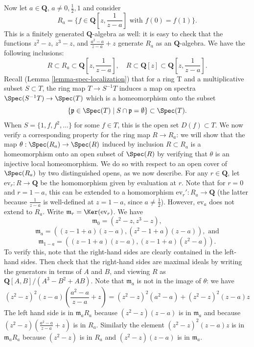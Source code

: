 \begin{example}
\medskip\noindent
Now let $a \in \mathbf{Q}$, $a \neq 0, \frac{1}{2}, 1$ and
consider
$$
R_a = \{ f \in \mathbf{Q}[z, \frac{1}{z-a}]\text{ with }f(0) = f(1)
\}.
$$
This is a finitely generated $\mathbf{Q}$-algebra as well: it is
easy to check that the functions $z^2-z$, $z^3-z$, and
$\frac{a^2-a}{z-a}+z$ generate $R_a$ as an $\mathbf{Q}$-algebra.  We
have the following inclusions:
$$
R\subset R_a\subset\mathbf{Q}[z, \frac{1}{z-a}], \quad
R\subset\mathbf{Q}[z]\subset\mathbf{Q}[z, \frac{1}{z-a}].
$$
Recall (Lemma \ref{lemma-spec-localization}) that for a ring T and a
multiplicative subset $S\subset T$, the ring map $T \to S^{-1}T$
induces a map on spectra $\Spec(S^{-1}T) \to \Spec(T)$
which is a homeomorphism onto the subset
$$
\{\mathfrak p \in \Spec(T) \mid S \cap \mathfrak p = \emptyset\}
\subset \Spec(T).
$$
When $S = \{ 1, f, f^2, \ldots\}$ for some $f\in T$, this is
the open set $D(f)\subset T$.  We now verify a corresponding
property for the ring map $R \to R_a$: we will show that the map
$\theta : \Spec(R_a) \to \Spec(R)$ induced by inclusion
$R\subset R_a$ is a homeomorphism onto an open subset of
$\Spec(R)$ by verifying that $\theta$ is an injective local
homeomorphism.  We do so with respect to an open cover of
$\Spec(R_a)$ by two distinguished opens, as we now describe.
For any $r\in\mathbf{Q}$, let $\text{ev}_r : R \to \mathbf{Q}$ be the
homomorphism given by evaluation at $r$.  Note that for $r = 0$ and
$r = 1-a$, this can be extended to a homomorphism
$\text{ev}_r' : R_a \to \mathbf{Q}$ (the latter because $\frac{1}{z-a}$
is well-defined at $z = 1-a$, since $a\neq\frac{1}{2}$).  However,
$\text{ev}_a$ does not extend to $R_a$.  Write
$\mathfrak{m}_r = \Ker(\text{ev}_r)$. We have
$$
\mathfrak{m}_0 = (z^2-z, z^3-z),
$$
$$
\mathfrak{m}_a = ((z-1 + a)(z-a), (z^2-1 + a)(z-a)), \text{ and}
$$
$$
\mathfrak{m}_{1-a} = ((z-1 + a)(z-a), (z-1 + a)(z^2-a)).
$$
To verify this, note that the right-hand sides are clearly contained in
the left-hand sides. Then check that the right-hand sides are
maximal ideals by writing the generators in terms of $A$ and $B$,
and viewing $R$ as $\mathbf{Q}[A, B]/(A^3-B^2 + AB)$. Note that
$\mathfrak{m}_a$ is not in the image of $\theta$: we have
$$
(z^2 - z)^2(z - a)\left(\frac{a^2 - a}{z - a} + z\right) =
(z^2 - z)^2(a^2 - a) + (z^2 - z)^2(z - a)z
$$
The left hand side is in $\mathfrak m_a R_a$ because
$(z^2 - z)(z - a)$ is in $\mathfrak m_a$ and because
$(z^2 - z)(\frac{a^2 - a}{z - a} + z)$ is in $R_a$. Similarly
the element $(z^2 - z)^2(z - a)z$ is in $\mathfrak m_a R_a$
because $(z^2 - z)$ is in $R_a$ and $(z^2 - z)(z - a)$ is in $\mathfrak m_a$.

\end{example}

